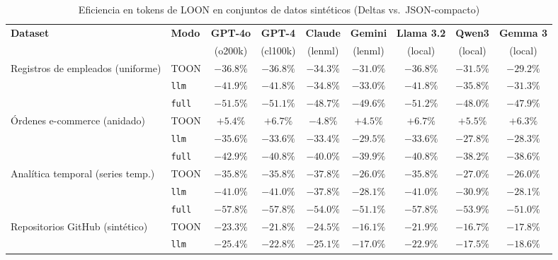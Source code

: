 
\begin{table}[t]
  \centering
  \caption{Eficiencia en tokens de LOON en conjuntos de datos sintéticos (Deltas vs.\ JSON-compacto)}
  \label{tab:tokens-synth}
  \scriptsize
  \begin{tabular}{@{}llccccccc@{}}
    \toprule
    \textbf{Dataset} & \textbf{Modo} & \textbf{GPT-4o} & \textbf{GPT-4} & \textbf{Claude} & \textbf{Gemini} & \textbf{Llama 3.2} & \textbf{Qwen3} & \textbf{Gemma 3} \\
     & & \scriptsize (o200k) & \scriptsize (cl100k) & \scriptsize (lenml) & \scriptsize (lenml) & \scriptsize (local) & \scriptsize (local) & \scriptsize (local) \\
    \midrule
    \multirow{3}{*}{Registros de empleados (uniforme)} & TOON & $-36.8\%$ & $-36.8\%$ & $-34.3\%$ & $-31.0\%$ & $-36.8\%$ & $-31.5\%$ & $-29.2\%$ \\
     & \texttt{llm} & $-41.9\%$ & $-41.8\%$ & $-34.8\%$ & $-33.0\%$ & $-41.8\%$ & $-35.8\%$ & $-31.3\%$ \\
     & \texttt{full} & $-51.5\%$ & $-51.1\%$ & $-48.7\%$ & $-49.6\%$ & $-51.2\%$ & $-48.0\%$ & $-47.9\%$ \\
    \cline{2-9}
    \multirow{3}{*}{Órdenes e-commerce (anidado)} & TOON & $+5.4\%$ & $+6.7\%$ & $-4.8\%$ & $+4.5\%$ & $+6.7\%$ & $+5.5\%$ & $+6.3\%$ \\
     & \texttt{llm} & $-35.6\%$ & $-33.6\%$ & $-33.4\%$ & $-29.5\%$ & $-33.6\%$ & $-27.8\%$ & $-28.3\%$ \\
     & \texttt{full} & $-42.9\%$ & $-40.8\%$ & $-40.0\%$ & $-39.9\%$ & $-40.8\%$ & $-38.2\%$ & $-38.6\%$ \\
    \cline{2-9}
    \multirow{3}{*}{Analítica temporal (series temp.)} & TOON & $-35.8\%$ & $-35.8\%$ & $-37.8\%$ & $-26.0\%$ & $-35.8\%$ & $-27.0\%$ & $-26.0\%$ \\
     & \texttt{llm} & $-41.0\%$ & $-41.0\%$ & $-37.8\%$ & $-28.1\%$ & $-41.0\%$ & $-30.9\%$ & $-28.1\%$ \\
     & \texttt{full} & $-57.8\%$ & $-57.8\%$ & $-54.0\%$ & $-51.1\%$ & $-57.8\%$ & $-53.9\%$ & $-51.0\%$ \\
    \cline{2-9}
    \multirow{3}{*}{Repositorios GitHub (sintético)} & TOON & $-23.3\%$ & $-21.8\%$ & $-24.5\%$ & $-16.1\%$ & $-21.9\%$ & $-16.7\%$ & $-17.8\%$ \\
     & \texttt{llm} & $-25.4\%$ & $-22.8\%$ & $-25.1\%$ & $-17.0\%$ & $-22.9\%$ & $-17.5\%$ & $-18.6\%$ \\

\end{tabular}
\end{table}
